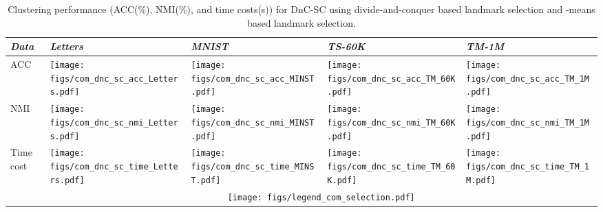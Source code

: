 \documentclass[a4paper,fleqn]{cas-dc}
\begin{document}
\begin{table}\centering
  \caption{Clustering performance (ACC(\%), NMI(\%), and time costs(s)) for DnC-SC using divide-and-conquer based landmark selection and -means based landmark selection.}
  \label{table:compare_sel_strategies}
  \begin{threeparttable}
    \begin{tabular}{m{0.75cm}<{\centering}|m{1.45cm}<{\centering}m{1.45cm}<{\centering}m{1.45cm}<{\centering}m{1.45cm}<{\centering}}
      \toprule
      \emph{Data} & \emph{Letters} & \emph{MNIST} & \emph{TS-60K} & \emph{TM-1M} \\
      \midrule
      \multirow{1}{*}{ACC}
      &\texttt{[image: figs/com\_dnc\_sc\_acc\_Letters.pdf]}
      &\texttt{[image: figs/com\_dnc\_sc\_acc\_MINST.pdf]}
      &\texttt{[image: figs/com\_dnc\_sc\_acc\_TM\_60K.pdf]}
      &\texttt{[image: figs/com\_dnc\_sc\_acc\_TM\_1M.pdf]}\\
      NMI
      &\texttt{[image: figs/com\_dnc\_sc\_nmi\_Letters.pdf]}
      &\texttt{[image: figs/com\_dnc\_sc\_nmi\_MINST.pdf]}
      &\texttt{[image: figs/com\_dnc\_sc\_nmi\_TM\_60K.pdf]}
      &\texttt{[image: figs/com\_dnc\_sc\_nmi\_TM\_1M.pdf]}\\
      Time cost
      &\texttt{[image: figs/com\_dnc\_sc\_time\_Letters.pdf]}
      &\texttt{[image: figs/com\_dnc\_sc\_time\_MINST.pdf]}
      &\texttt{[image: figs/com\_dnc\_sc\_time\_TM\_60K.pdf]}
      &\texttt{[image: figs/com\_dnc\_sc\_time\_TM\_1M.pdf]}\\
      &\multicolumn{4}{c}{\texttt{[image: figs/legend\_com\_selection.pdf]}}\\
      \bottomrule
    \end{tabular}
  \end{threeparttable}
\end{table}
\end{document}
